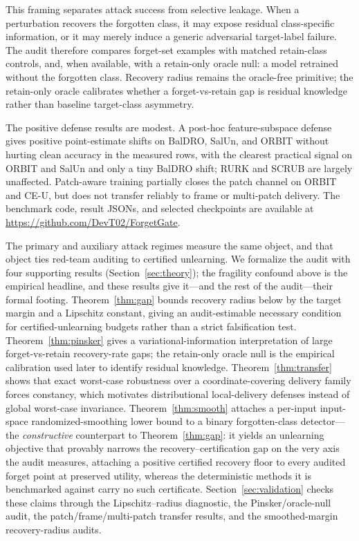 \documentclass[11pt]{article}
\begin{document}
This framing separates attack success from selective leakage. When a perturbation recovers the forgotten class, it may expose residual class-specific information, or it may merely induce a generic adversarial target-label failure. The audit therefore compares forget-set examples with matched retain-class controls, and, when available, with a retain-only oracle null: a model retrained without the forgotten class. Recovery radius remains the oracle-free primitive; the retain-only oracle calibrates whether a forget-vs-retain gap is residual knowledge rather than baseline target-class asymmetry.

The positive defense results are modest. A post-hoc feature-subspace defense gives positive point-estimate shifts on BalDRO, SalUn, and ORBIT without hurting clean accuracy in the measured rows, with the clearest practical signal on ORBIT and SalUn and only a tiny BalDRO shift; RURK and SCRUB are largely unaffected. Patch-aware training partially closes the patch channel on ORBIT and CE-U, but does not transfer reliably to frame or multi-patch delivery. The benchmark code, result JSONs, and selected checkpoints are available at \url{https://github.com/DevT02/ForgetGate}.

The primary and auxiliary attack regimes measure the same object, and that object ties red-team auditing to certified unlearning. We formalize the audit with four supporting results (Section~\ref{sec:theory}); the fragility confound above is the empirical headline, and these results give it---and the rest of the audit---their formal footing. Theorem~\ref{thm:gap} bounds recovery radius below by the target margin and a Lipschitz constant, giving an audit-estimable necessary condition for certified-unlearning budgets rather than a strict falsification test. Theorem~\ref{thm:pinsker} gives a variational-information interpretation of large forget-vs-retain recovery-rate gaps; the retain-only oracle null is the empirical calibration used later to identify residual knowledge. Theorem~\ref{thm:transfer} shows that exact worst-case robustness over a coordinate-covering delivery family forces constancy, which motivates distributional local-delivery defenses instead of global worst-case invariance. Theorem~\ref{thm:smooth} attaches a per-input input-space randomized-smoothing lower bound to a binary forgotten-class detector---the \emph{constructive} counterpart to Theorem~\ref{thm:gap}: it yields an unlearning objective that provably narrows the recovery--certification gap on the very axis the audit measures, attaching a positive certified recovery floor to every audited forget point at preserved utility, whereas the deterministic methods it is benchmarked against carry no such certificate. Section~\ref{sec:validation} checks these claims through the Lipschitz--radius diagnostic, the Pinsker/oracle-null audit, the patch/frame/multi-patch transfer results, and the smoothed-margin recovery-radius audits.
\end{document}
